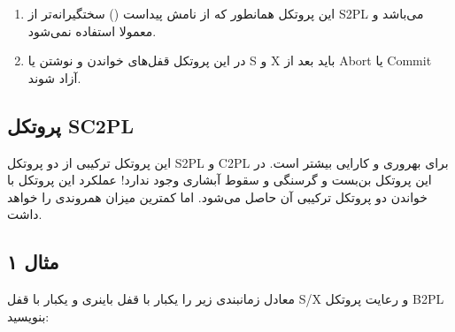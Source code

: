 \begin{enumerate}
    \item این پروتکل همانطور که از نامش پیداست () سختگیرانه‌تر
    از S2PL می‌باشد و معمولا استفاده نمی‌شود.
    \item در این پروتکل قفل‌های خواندن و نوشتن یا S و X باید بعد از Abort یا
    Commit آزاد شوند.
\end{enumerate}

\subsection{پروتکل SC2PL}

این پروتکل ترکیبی از دو پروتکل S2PL و C2PL برای بهروری و کارایی بیشتر است. در
این پروتکل بن‌بست و گرسنگی و سقوط آبشاری وجود ندارد! عملکرد این پروتکل با خواندن
دو پروتکل ترکیبی آن حاصل می‌شود. اما کمترین میزان همروندی را خواهد داشت.

\begin{LTR}
    \begin{table}[h]
        \begin{RTL}
            \caption{زمانبندی $S_{9}$}
        \end{RTL}
        \centering
    \end{table}
\end{LTR}

\subsection*{مثال ۱}

معادل زمانبندی زیر را یکبار با قفل باینری و یکبار با قفل S/X و رعایت پروتکل B2PL
بنویسید:

\begin{LTR}
    \begin{table}[h]
        \begin{RTL}
            \caption{زمانبندی $S_{10}$}
        \end{RTL}
        \centering
    \end{table}
\end{LTR}

